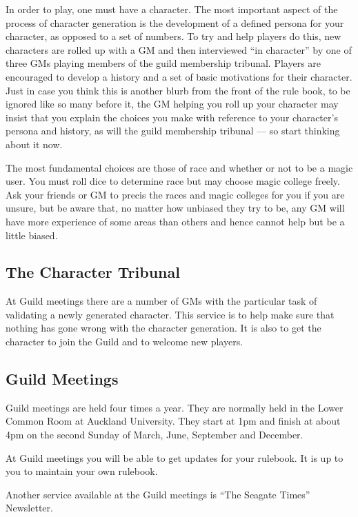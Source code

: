 \documentclass[twoside,a4paper]{article}
\begin{document}
\begin{multicols}{2}
In order to play, one must have a character.  The most important
aspect of the process of character generation is the development of a
defined persona for your character, as opposed to a set of numbers.
To try and help players do this, new characters are rolled up with a
GM and then interviewed ``in character'' by one of three GMs playing
members of the guild membership tribunal.  Players are encouraged to
develop a history and a set of basic motivations for their character.
Just in case you think this is another blurb from the front of the
rule book, to be ignored like so many before it, the GM helping you
roll up your character may insist that you explain the choices you
make with reference to your character's persona and history, as will
the guild membership tribunal --- so start thinking about it now.

The most fundamental choices are those of race and whether or not to
be a magic user.  You must roll dice to determine race but may choose
magic college freely.  Ask your friends or GM to precis the races and
magic colleges for you if you are unsure, but be aware that, no matter
how unbiased they try to be, any GM will have more experience of some
areas than others and hence cannot help but be a little biased.


\subsection{The Character Tribunal}

At Guild meetings there are a number of GMs with the particular task
of validating a newly generated character. This service is to help
make sure that nothing has gone wrong with the character generation.
It is also to get the character to join the Guild and to welcome new
players.

\subsection{Guild Meetings}

Guild meetings are held four times a year.  They are normally held in
the Lower Common Room at Auckland University. They start at 1pm and
finish at about 4pm on the second Sunday of March, June, September and
December.

At Guild meetings you will be able to get updates for your rulebook.
It is up to you to maintain your own rulebook.

Another service available at the Guild meetings is ``The Seagate Times''
Newsletter.


\end{multicols}
\end{document}
